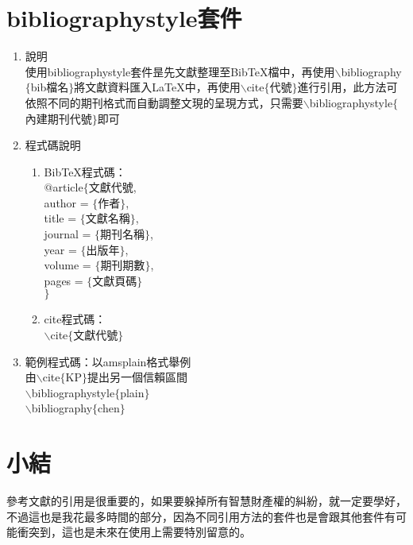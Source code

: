 \section{bibliographystyle套件}
\begin{enumerate}
\item 說明\\
使用bibliographystyle套件昰先文獻整理至BibTeX檔中，再使用$\backslash$bibliography$\{$bib檔名$\}$將文獻資料匯入\LaTeX 中，再使用$\backslash$cite$\{$代號$\}$進行引用，此方法可依照不同的期刊格式而自動調整文現的呈現方式，只需要$\backslash$bibliographystyle$\{$內建期刊代號$\}$即可\\
\item 程式碼說明\\
\begin{enumerate}[label=1.]
\item BibTeX程式碼：\\
$@$article$\{$文獻代號,\\
  author = $\{$作者$\}$,\\
  title = $\{$文獻名稱$\}$,\\
  journal = $\{$期刊名稱$\}$,\\
  year = $\{$出版年$\}$,\\
  volume = $\{$期刊期數$\}$,\\
  pages = $\{$文獻頁碼$\}$ \\
$\}$\\
\item cite程式碼：\\
$\backslash$cite$\{$文獻代號$\}$\\

\end{enumerate}
\item 範例程式碼：以amsplain格式舉例\\

由$\backslash$cite$\{$KP$\}$提出另一個信賴區間\\
$\backslash$bibliographystyle$\{$plain$\}$\\
$\backslash$bibliography$\{$chen$\}$

%

%

\end{enumerate}
\section*{小結}
參考文獻的引用是很重要的，如果要躲掉所有智慧財產權的糾紛，就一定要學好，不過這也是我花最多時間的部分，因為不同引用方法的套件也是會跟其他套件有可能衝突到，這也是未來在使用上需要特別留意的。

%
%